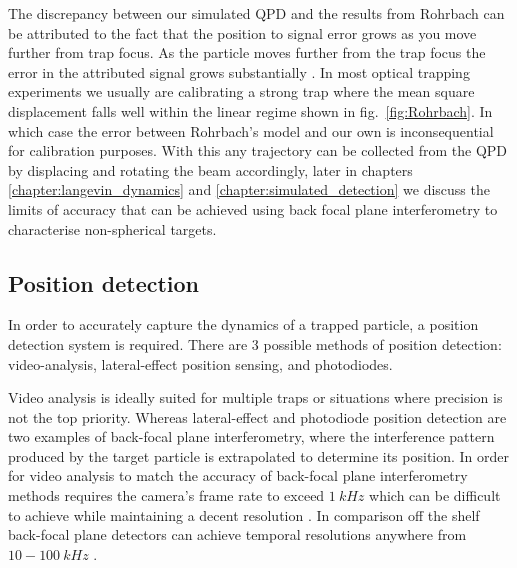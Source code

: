 The discrepancy between our simulated QPD and the results 
from Rohrbach can be attributed to the fact that the position 
to signal error grows as you move further from trap focus. 
As the particle moves further from the trap focus the error 
in the attributed signal grows substantially \cite{Rohrbach2002}.
In most optical trapping experiments we usually are calibrating 
a strong trap where the mean square displacement falls well within 
the linear regime shown in fig.~\ref{fig:Rohrbach}. In which case 
the error between Rohrbach's model and our own is inconsequential 
for calibration purposes. With this any trajectory can be collected 
from the QPD by displacing and rotating the beam accordingly, 
later in chapters \ref{chapter:langevin_dynamics} and \ref{chapter:simulated_detection} we discuss the limits of 
accuracy that can be achieved using back focal plane interferometry 
to characterise non-spherical targets.

\subsection{Position detection}
\label{sec:position_detection}
In order to accurately capture the dynamics of a trapped particle, a 
position detection system is required. There are 3 possible methods 
of position detection: video-analysis, lateral-effect position sensing, 
and photodiodes. 

Video analysis is ideally suited for multiple traps or situations where 
precision is not the top priority. Whereas lateral-effect and photodiode 
position detection are two examples of back-focal plane interferometry, 
where the interference pattern produced by the target particle is 
extrapolated to determine its position. In order for video analysis to 
match the accuracy of back-focal plane interferometry methods requires 
the camera's frame rate to exceed $1\ kHz$ which can be difficult to 
achieve while maintaining a decent resolution \cite{Gibson2008}. In 
comparison off the shelf back-focal plane detectors can achieve temporal 
resolutions anywhere from $10-100\ kHz$ \cite{BergSoerensen2004}. 

